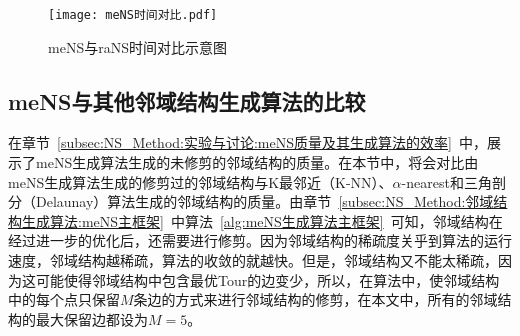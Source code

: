 \begin{figure}[htb]
    \texttt{[image: meNS时间对比.pdf]}
    \caption[meNS与raNS时间对比示意图]{meNS与raNS时间对比示意图}
    \label{fig:meNS与raNS时间对比示意图}
\end{figure}

\subsection{meNS与其他邻域结构生成算法的比较}
\label{subsec:NS_Method:实验与讨论:meNS与其他邻域结构生成算法的比较}
在章节~\ref{subsec:NS_Method:实验与讨论:meNS质量及其生成算法的效率}~中，展示了meNS生成算法生成的未修剪的邻域结构的质量。在本节中，将会对比由meNS生成算法生成的修剪过的邻域结构与K最邻近（K-NN）、$\alpha$-nearest和三角剖分（Delaunay）算法生成的邻域结构的质量。由章节~\ref{subsec:NS_Method:邻域结构生成算法:meNS主框架}~中算法~\ref{alg:meNS生成算法主框架}~可知，邻域结构在经过进一步的优化后，还需要进行修剪。因为邻域结构的稀疏度关乎到算法的运行速度，邻域结构越稀疏，算法的收敛的就越快。但是，邻域结构又不能太稀疏，因为这可能使得邻域结构中包含最优Tour的边变少，所以，在算法中，使邻域结构中的每个点只保留$M$条边的方式来进行邻域结构的修剪，在本文中，所有的邻域结构的最大保留边都设为$M=5$。
\setlength{\tabcolsep}{13pt}
